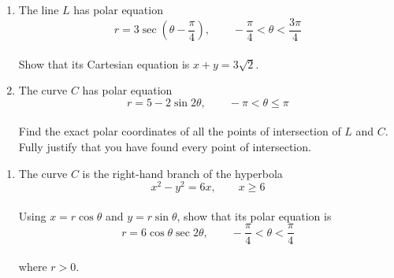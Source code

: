 \documentclass[leqno]{article}
\begin{document}
\begin{enumerate}[
  label=\textbf{\arabic*.},
  leftmargin=*,
  topsep=0pt,
  partopsep=0pt,
  parsep=0pt
]
\newpage

\questionitem

\begin{enumerate}[label=\textbf{(\alph*)}]
\item The line $L$ has polar equation
\[
r=3\sec\left(\theta-\frac{\pi}{4}\right),\qquad -\frac{\pi}{4}<\theta<\frac{3\pi}{4}
\] \\
Show that its Cartesian equation is $x+y=3\sqrt{2}$.  \\
\item The curve $C$ has polar equation
\[
r=5-2\sin 2\theta,\qquad -\pi<\theta\leq\pi
\] \\
Find the exact polar coordinates of all the points of intersection of $L$ and $C$. \\
Fully justify that you have found every point of intersection.  \\
\end{enumerate}

\newpage

\questionitem

\begin{enumerate}[label=\textbf{(\alph*)}]
\item The curve $C$ is the right-hand branch of the hyperbola
\[
x^2-y^2=6x,\qquad x\geq6
\] \\
Using $x=r\cos\theta$ and $y=r\sin\theta$, show that its polar equation is
\[
r=6\cos\theta\sec 2\theta,\qquad -\frac{\pi}{4}<\theta<\frac{\pi}{4}
\] \\
where $r>0$.  \\

\begin{figure}[H]
    \centering
{}
\end{figure}



\end{enumerate}
\end{enumerate}
\end{document}
